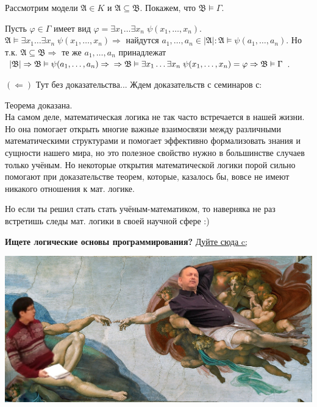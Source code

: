 \documentclass[18pt, a4paper]{extarticle}
\newcommand{\Gm}{\Gamma}
\newcommand{\vp}{\varphi}
\newcommand{\vD}{\vDash}
\newcommand{\leftdok}{\boxed{(\Leftarrow)}}
\newcommand{\mA}{\mathfrak{A}}
\newcommand{\mB}{\mathfrak{B}}
\begin{document}
Рассмотрим модели $\mA\in K$ и $\mA\subseteq\mB$. Покажем, что $\mB\vD\Gm$.

Пусть $\vp\in\Gm$ имеет вид $\vp=\exists x_1\dots\exists x_n\;\psi(x_1,\dots,x_n)$. 
\newline$\mA\vD\exists x_1\dots\exists x_n\;\psi(x_1,\dots,x_n)\Rightarrow$ найдутся $a_1,\dots,a_n\in|\mA|\!:\mA\vD\psi(a_1,\dots,a_n)$. Но т.к. $\mA\subseteq\mB\Rightarrow$ те же $a_1,\dots,a_n$ принадлежат $|\mB|\Rightarrow\mB\vD\psi(a_1,\dots,a_n)\Rightarrow\newline\Rightarrow\mB\vD\exists x_1\dots\exists x_n\;\psi(x_1,\dots,x_n)=\vp\Rightarrow\mB\vD\Gm$.

$\leftdok$ Тут без доказательства... Ждем доказательств с семинаров с:

Теорема доказана.\\

На самом деле, математическая логика не так часто встречается в нашей жизни. Но она помогает открыть многие важные взаимосвязи между различными математическими структурами и помогает эффективно формализовать знания и сущности нашего мира, но это полезное свойство нужно в большинстве случаев только учёным. Но некоторые открытия математической логики порой сильно помогают при доказательстве теорем, которые, казалось бы, вовсе не имеют никакого отношения к мат. логике. 

Но если ты решил стать стать учёным-математиком, то наверняка не раз встретишь следы мат. логики в своей научной сфере :)

\begin{center}
    \textbf{Ищете логические основы программирования?} \href{https://drive.google.com/file/d/1-0eo0U2wBOSOjFTIUQFQqQcLD1rjjM3B/view}{\underline{Дуйте сюда c;}}
\end{center} 

\begin{center}
    \includegraphics[scale=0.35]{images/palch.jpg}
\end{center}
\end{document}
